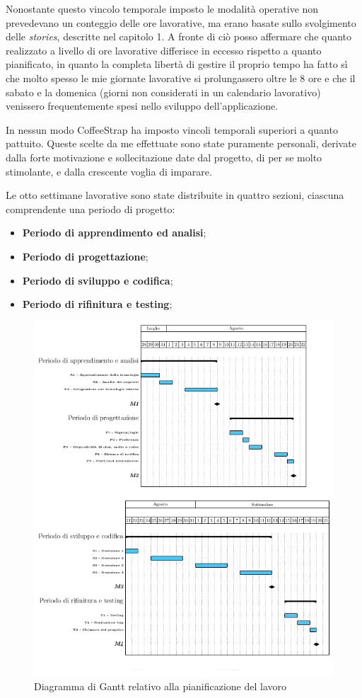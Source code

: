 Nonostante questo vincolo temporale imposto le modalità operative non prevedevano un conteggio delle ore lavorative, ma erano basate sullo svolgimento delle \textit{stories}, descritte nel capitolo 1. A fronte di ciò posso affermare che quanto realizzato a livello di ore lavorative differisce in eccesso rispetto a quanto pianificato, in quanto la completa libertà di gestire il proprio tempo ha fatto sì che molto spesso le mie giornate lavorative si prolungassero oltre le 8 ore e che il sabato e la domenica (giorni non considerati in un calendario lavorativo) venissero frequentemente spesi nello sviluppo dell'applicazione.

In nessun modo CoffeeStrap ha imposto vincoli temporali superiori a quanto pattuito. Queste scelte da me effettuate sono state puramente personali, derivate dalla forte motivazione e sollecitazione date dal progetto, di per se molto stimolante, e dalla crescente voglia di imparare.

Le otto settimane lavorative sono state distribuite in quattro sezioni, ciascuna comprendente una periodo di progetto:

\begin{itemize}

\item \textbf{Periodo di apprendimento ed analisi};
\item \textbf{Periodo di progettazione};
\item \textbf{Periodo di sviluppo e codifica};
\item \textbf{Periodo di rifinitura e testing};

\end{itemize}

\begin{figure}[htpd]
\centering
\includegraphics[width=\textwidth]{../immagini/gantt}
\caption{Diagramma di Gantt relativo alla pianificazione del lavoro}  
\end{figure}


